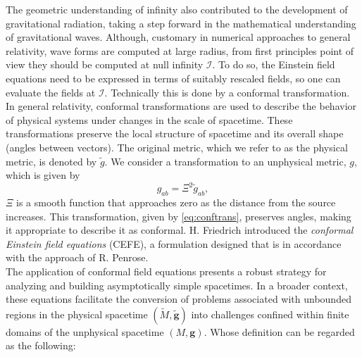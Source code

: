 The geometric understanding of infinity also contributed to the development of gravitational radiation, taking a step forward in the mathematical understanding of gravitational waves. Although, customary in numerical approaches to general relativity, wave forms are computed at large radius, from first principles point of view they should be computed at null infinity $\mathscr{I}$. To do so, the Einstein field equations need to be expressed in terms of suitably rescaled fields, so one can evaluate the fields at $\mathscr{I}$. Technically this is done by a conformal transformation. In general relativity, conformal transformations are used to describe the behavior of physical systems under changes in the scale of spacetime. These transformations preserve the local structure of spacetime and its overall shape (angles between vectors). The original metric, which we refer to as the physical metric, is denoted by $\tilde{g}$. We consider a transformation to an unphysical metric, $g$, which is given by 
\begin{equation}\label{eq:conftrans}
	g_{ab} = \Xi^2 \tilde{g}_{ab},
\end{equation}
$\Xi$ is a smooth function that approaches zero as the distance from the source increases. This transformation, given by \eqref{eq:conftrans}, preserves angles, making it appropriate to describe it as conformal. H. Friedrich introduced the \textit{conformal Einstein field
equations} (CEFE), a formulation designed that is in accordance with
the approach of R. Penrose.\\
\noindent
The application of conformal field equations presents a robust strategy for analyzing and building asymptotically simple spacetimes. In a broader context, these equations facilitate the conversion of problems associated with unbounded regions in the physical spacetime $(\tilde{{M}}, \boldsymbol{\tilde{g}})$ into challenges confined within finite domains of the unphysical spacetime $({{M}},\boldsymbol{g})$. Whose definition can be regarded as the following: \\
